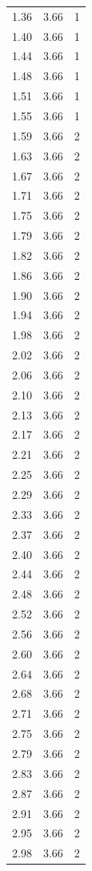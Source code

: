 \begin{longtable}{lrr}
  1.36 & 3.66 & 1 \\
  1.40 & 3.66 & 1 \\
  1.44 & 3.66 & 1 \\
  1.48 & 3.66 & 1 \\
  1.51 & 3.66 & 1 \\
  1.55 & 3.66 & 1 \\
  1.59 & 3.66 & 2 \\
  1.63 & 3.66 & 2 \\
  1.67 & 3.66 & 2 \\
  1.71 & 3.66 & 2 \\
  1.75 & 3.66 & 2 \\
  1.79 & 3.66 & 2 \\
  1.82 & 3.66 & 2 \\
  1.86 & 3.66 & 2 \\
  1.90 & 3.66 & 2 \\
  1.94 & 3.66 & 2 \\
  1.98 & 3.66 & 2 \\
  2.02 & 3.66 & 2 \\
  2.06 & 3.66 & 2 \\
  2.10 & 3.66 & 2 \\
  2.13 & 3.66 & 2 \\
  2.17 & 3.66 & 2 \\
  2.21 & 3.66 & 2 \\
  2.25 & 3.66 & 2 \\
  2.29 & 3.66 & 2 \\
  2.33 & 3.66 & 2 \\
  2.37 & 3.66 & 2 \\
  2.40 & 3.66 & 2 \\
  2.44 & 3.66 & 2 \\
  2.48 & 3.66 & 2 \\
  2.52 & 3.66 & 2 \\
  2.56 & 3.66 & 2 \\
  2.60 & 3.66 & 2 \\
  2.64 & 3.66 & 2 \\
  2.68 & 3.66 & 2 \\
  2.71 & 3.66 & 2 \\
  2.75 & 3.66 & 2 \\
  2.79 & 3.66 & 2 \\
  2.83 & 3.66 & 2 \\
  2.87 & 3.66 & 2 \\
  2.91 & 3.66 & 2 \\
  2.95 & 3.66 & 2 \\
  2.98 & 3.66 & 2 \\

\end{longtable}
